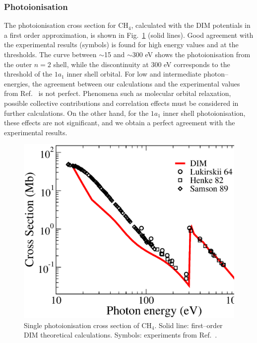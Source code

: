 \documentclass[10pt]{article}
\begin{document}
\subsubsection{Photoionisation}
\label{subsubsec:photoch4}

The photoionisation cross section for CH$_4$, calculated with the DIM 
potentials in a first order approximation, is shown in 
Fig.~\ref{fig:photoch4} (solid lines).
Good agreement with the experimental results (symbols) is found for 
high energy values and at the thresholds. The curve between $\sim$15 and
$\sim$300 eV shows the photoionisation from the outer $n=2$ shell, while 
the discontinuity at 300 eV corresponds to the threshold of
the $1a_1$ inner shell orbital. For low and intermediate photon--energies,
the agreement between our calculations and the experimental values 
from Ref.~\cite{Lukirskii1964,Henke1982,Samson1989} is not perfect.
Phenomena such as molecular orbital relaxation, possible 
collective contributions and correlation effects must be considered 
in further calculations. On the other hand, for the $1a_1$ inner shell
photoionisation, these effects are not significant, and we obtain a 
perfect agreement with the experimental results.
\begin{figure}[H]
\centering
\includegraphics[height=0.23\textheight]{figures/dimpot/photoch4.eps}
\caption{Single photoionisation cross section of CH$_4$.
Solid line: first--order DIM theoretical calculations. Symbols: experiments
from Ref.~\cite{Lukirskii1964,Henke1982,Samson1989}.}
\label{fig:photoch4}
\end{figure}
\end{document}
